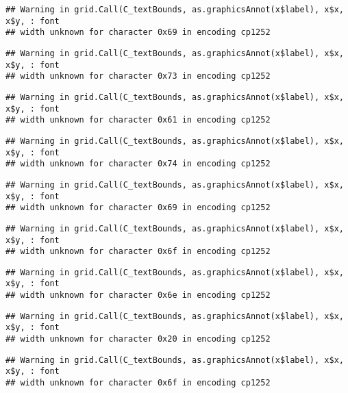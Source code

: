 \documentclass[
]{article}
\begin{document}
\begin{verbatim}
## Warning in grid.Call(C_textBounds, as.graphicsAnnot(x$label), x$x, x$y, : font
## width unknown for character 0x69 in encoding cp1252
\end{verbatim}

\begin{verbatim}
## Warning in grid.Call(C_textBounds, as.graphicsAnnot(x$label), x$x, x$y, : font
## width unknown for character 0x73 in encoding cp1252
\end{verbatim}

\begin{verbatim}
## Warning in grid.Call(C_textBounds, as.graphicsAnnot(x$label), x$x, x$y, : font
## width unknown for character 0x61 in encoding cp1252
\end{verbatim}

\begin{verbatim}
## Warning in grid.Call(C_textBounds, as.graphicsAnnot(x$label), x$x, x$y, : font
## width unknown for character 0x74 in encoding cp1252
\end{verbatim}

\begin{verbatim}
## Warning in grid.Call(C_textBounds, as.graphicsAnnot(x$label), x$x, x$y, : font
## width unknown for character 0x69 in encoding cp1252
\end{verbatim}

\begin{verbatim}
## Warning in grid.Call(C_textBounds, as.graphicsAnnot(x$label), x$x, x$y, : font
## width unknown for character 0x6f in encoding cp1252
\end{verbatim}

\begin{verbatim}
## Warning in grid.Call(C_textBounds, as.graphicsAnnot(x$label), x$x, x$y, : font
## width unknown for character 0x6e in encoding cp1252
\end{verbatim}

\begin{verbatim}
## Warning in grid.Call(C_textBounds, as.graphicsAnnot(x$label), x$x, x$y, : font
## width unknown for character 0x20 in encoding cp1252
\end{verbatim}

\begin{verbatim}
## Warning in grid.Call(C_textBounds, as.graphicsAnnot(x$label), x$x, x$y, : font
## width unknown for character 0x6f in encoding cp1252
\end{verbatim}
\end{document}
